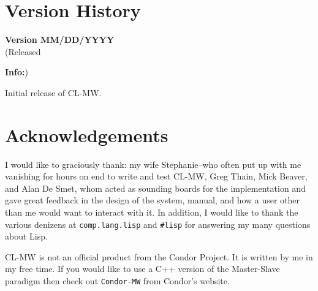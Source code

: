 \documentclass[titlepage,12pt]{book}
\newcommand{\xsmall}{\latexhtml{\small}{}}
\newcommand{\xnormalsize}{\latexhtml{\normalsize}{}}
\newcommand{\mw}{Master-Slave\xspace}
\newcommand{\clmw}{\xsmall\textsc{CL-MW}\xnormalsize\xspace}
\newcommand{\bold}[1]{\textbf{#1}\xspace}
\newenvironment{verhist}[2]
	{\textbf{Version #1}\\\indent\xsmall(Released #2)\xnormalsize
	 \begin{itemize}}
	{\end{itemize}}
\newcommand{\info}{\item \bold{Info:}\xspace}
\begin{document}
\chapter{\label{version-history}Version History}

\begin{verhist}{0.1}{MM/DD/YYYY}
\info Initial release of \clmw.
\end{verhist}

\chapter{Acknowledgements}

I would like to graciously thank: my wife Stephanie--who often put
up with me vanishing for hours on end to write and test \clmw, Greg
Thain, Mick Beaver, and Alan De Smet, whom acted as sounding boards
for the implementation and gave great feedback in the design of the
system, manual, and how a user other than me would want to interact
with it. In addition, I would like to thank the various denizens at
\texttt{comp.lang.lisp} and \texttt{\#lisp} for answering my many
questions about Lisp.

\clmw is not an official product from the Condor Project. It is written
by me in my free time. If you would like to use a C++ version of the
\mw paradigm then check out \texttt{Condor-MW} from Condor's website.

\backmatter
\end{document}
